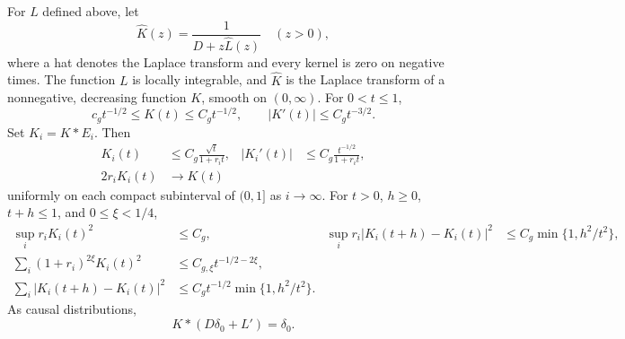 \begin{lemma}\label{entr:kernels}
For \(L\) defined above, let
\[
 \widehat K(z)=\frac{1}{D+z\widehat L(z)}\quad(z>0),
\]
where a hat denotes the Laplace transform and every kernel is zero on
negative times.  The function \(L\) is locally integrable, and
\(\widehat K\) is the Laplace transform of a nonnegative, decreasing
function \(K\), smooth on \((0,\infty)\).  For \(0<t\le1\),
\begin{equation}\label{entr:K-bounds}
 c_g t^{-1/2}\le K(t)\le C_g t^{-1/2},
 \qquad |K'(t)|\le C_g t^{-3/2}.
\end{equation}
Set \(K_i=K*E_i\).  Then
\begin{align}
 K_i(t)&\le C_g\frac{\sqrt t}{1+r_it},&
 |K_i'(t)|&\le C_g\frac{t^{-1/2}}{1+r_it},             \label{entr:Ki-bounds}\\
 2r_iK_i(t)&\longrightarrow K(t)                       \label{entr:Ki-limit}
\end{align}
uniformly on each compact subinterval of \((0,1]\) as \(i\to\infty\).
For \(t>0\), \(h\ge0\), \(t+h\le1\), and \(0\le\xi<1/4\),
\begin{align}
 \sup_i r_iK_i(t)^2&\le C_g,&
 \sup_i r_i|K_i(t+h)-K_i(t)|^2
   &\le C_g\min\{1,h^2/t^2\},                          \label{entr:Ki-sup}\\
 \sum_i(1+r_i)^{2\xi}K_i(t)^2
   &\le C_{g,\xi}t^{-1/2-2\xi},                       \label{entr:Ki-sum}\\
 \sum_i|K_i(t+h)-K_i(t)|^2
   &\le C_g t^{-1/2}\min\{1,h^2/t^2\}.                \label{entr:Ki-increment}
\end{align}
As causal distributions,
\begin{equation}\label{entr:kernel-inverse}
 K*(D\delta_0+L')=\delta_0.
\end{equation}
\end{lemma}

